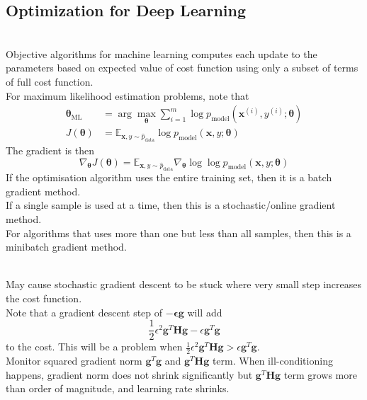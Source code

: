 \subsection{Optimization for Deep Learning}

\begin{remark} \\
Objective algorithms for machine learning computes each update to the parameters based on expected value of cost function using only a subset of terms of full cost function.\\
For maximum likelihood estimation problems, note that
\begin{align*}
\bm{\theta}_{\text{ML}} &= \arg \max_{\bm{\theta}} \sum\limits_{i=1}^m \log p_{\text{model}}(\bm{x}^{(i)}, y^{(i)}; \bm{\theta}) \nonumber \\
J(\bm{\theta}) &= \mathbb{E}_{\bm{x}, y \sim \hat{p}_{\text{data}}} \log p_{\text{model}} (\bm{x}, y; \bm{\theta}) \nonumber
\end{align*}
The gradient is then
\begin{equation*}
\nabla_{\bm{\theta}} J(\bm{\theta}) = \mathbb{E}_{\bm{x}, y \sim \hat{p}_{\text{data}}} \nabla_{\bm{\theta}} \log \log p_{\text{model}} (\bm{x}, y; \bm{\theta}) \nonumber
\end{equation*}
If the optimisation algorithm uses the entire training set, then it is a batch gradient method.\\
If a single sample is used at a time, then this is a stochastic/online gradient method.\\
For algorithms that uses more than one but less than all samples, then this is a minibatch gradient method.
\end{remark}

\begin{remark} \\
May cause stochastic gradient descent to be stuck where very small step increases the cost function.\\
Note that a gradient descent step of $- \bm{\epsilon} \bm{g}$ will add
\begin{equation*}
\frac{1}{2} \epsilon^2 \bm{g}^T \bm{H} \bm{g} - \epsilon \bm{g}^T \bm{g} \nonumber
\end{equation*}
to the cost. This will be a problem when $\frac{1}{2} \epsilon^2 \bm{g}^T \bm{H} \bm{g} > \epsilon \bm{g}^T \bm{g}$.\\
Monitor squared gradient norm $\bm{g}^T \bm{g}$ and $\bm{g}^T \bm{H} \bm{g}$ term. When ill-conditioning happens, gradient norm does not shrink significantly but $\bm{g}^T \bm{H} \bm{g}$ term grows more than order of magnitude, and learning rate shrinks.
\end{remark}

